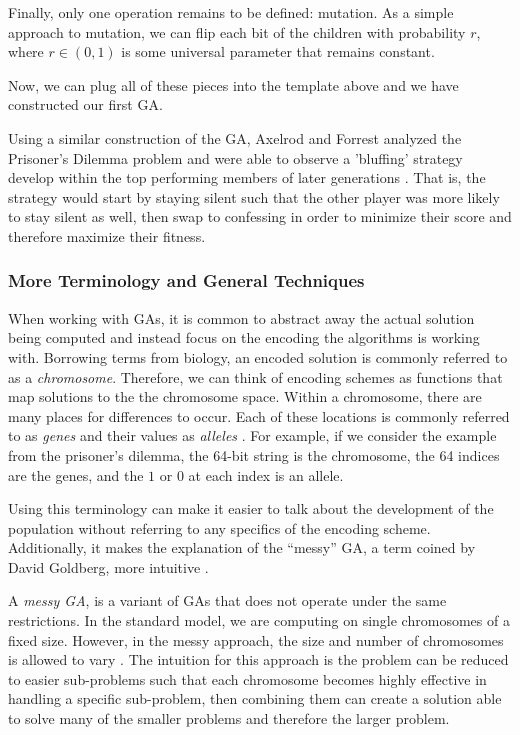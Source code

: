 \documentclass[11pt]{amsart}
\theoremstyle{definition}                  %
\theoremstyle{remark}                       %
\numberwithin{equation}{section}
\begin{document}
Finally, only one operation remains to be defined: mutation. As a simple approach to mutation, we can flip each bit of the children with probability $r$, where $r \in (0, 1)$ is some universal parameter that remains constant. 

Now, we can plug all of these pieces into the template above and we have constructed our first GA. 

Using a similar construction of the GA, Axelrod and Forrest analyzed the Prisoner's Dilemma problem and were able to observe a 'bluffing' strategy develop within the top performing members of later generations \cite{axelrod1987, holland1992}. That is, the strategy would start by staying silent such that the other player was more likely to stay silent as well, then swap to confessing in order to minimize their score and therefore maximize their fitness. 

\subsubsection{More Terminology and General Techniques}
When working with GAs, it is common to abstract away the actual solution being computed and instead focus on the encoding the algorithms is working with. Borrowing terms from biology, an encoded solution is commonly referred to as a \textit{chromosome}. Therefore, we can think of encoding schemes as functions that map solutions to the the chromosome space. Within a chromosome, there are many places for differences to occur. Each of these locations is commonly referred to as \textit{genes} and their values as \textit{alleles} \cite{jha2007}. For example, if we consider the example from the prisoner's dilemma, the 64-bit string is the chromosome, the 64 indices are the genes, and the $1$ or $0$ at each index is an allele. 

Using this terminology can make it easier to talk about the development of the population without referring to any specifics of the encoding scheme. Additionally, it makes the explanation of the ``messy'' GA, a term coined by David Goldberg, more intuitive \cite{goldberg1989}. 

A \textit{messy GA}, is a variant of GAs that does not operate under the same restrictions. In the standard model, we are computing on single chromosomes of a fixed size. However, in the messy approach, the size and number of chromosomes is allowed to vary \cite{goldberg1989}. The intuition for this approach is the problem can be reduced to easier sub-problems such that each chromosome becomes highly effective in handling a specific sub-problem, then combining them can create a solution able to solve many of the smaller problems and therefore the larger problem. 
\end{document}
